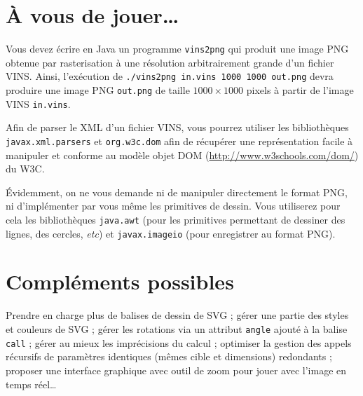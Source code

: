 \documentclass[10pt, a4paper]{article}
\begin{document}
\section{À vous de jouer\ldots}

Vous devez écrire en Java un programme \texttt{vins2png} qui produit une image PNG obtenue par rasterisation à une résolution arbitrairement grande d'un fichier VINS. Ainsi, l'exécution de \texttt{./vins2png in.vins 1000 1000 out.png} devra produire une image PNG \texttt{out.png} de taille $1000\times1000$ pixels à partir de l'image VINS \texttt{in.vins}.

Afin de parser le XML d'un fichier VINS, vous pourrez utiliser les bibliothèques \texttt{javax.xml.parsers} et \texttt{org.w3c.dom} afin de récupérer une représentation facile à manipuler et conforme au modèle objet DOM (\url{http://www.w3schools.com/dom/}) du W3C.

Évidemment, on ne vous demande ni de manipuler directement le format PNG, ni d'implémenter par vous même les primitives de dessin. Vous utiliserez pour cela les bibliothèques \texttt{java.awt} (pour les primitives permettant de dessiner des lignes, des cercles, \textit{etc}) et \texttt{javax.imageio} (pour enregistrer au format PNG).

\section{Compléments possibles}

Prendre en charge plus de balises de dessin de SVG ; gérer une partie des styles et couleurs de SVG ; gérer les rotations via un attribut \texttt{angle} ajouté à la balise \texttt{call} ; gérer au mieux les imprécisions du calcul ; optimiser la gestion des appels récursifs de paramètres identiques (mêmes cible et dimensions) redondants ; proposer une interface graphique avec outil de zoom pour jouer avec l'image en temps réel\ldots

\end{document}
